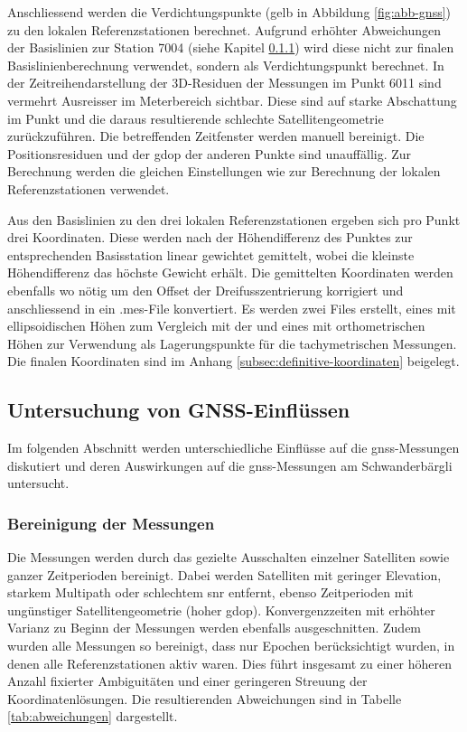 Anschliessend werden die Verdichtungspunkte (gelb in Abbildung \ref{fig:abb-gnss}) zu den lokalen Referenzstationen 
berechnet. Aufgrund erhöhter Abweichungen der Basislinien zur Station 7004 (siehe Kapitel \ref{sec:bereinigung_gnss}) wird 
diese nicht zur finalen Basislinienberechnung verwendet, sondern als Verdichtungspunkt berechnet. 
In der Zeitreihendarstellung der 3D-Residuen der Messungen im Punkt 6011 
sind vermehrt Ausreisser im Meterbereich sichtbar. Diese sind auf starke Abschattung im Punkt 
und die daraus resultierende schlechte Satellitengeometrie zurückzuführen. Die betreffenden Zeitfenster 
werden manuell bereinigt. Die Positionsresiduen und der \gls{gdop} der 
anderen Punkte sind unauffällig. Zur Berechnung werden die gleichen Einstellungen wie zur Berechnung der lokalen Referenzstationen 
verwendet.

Aus den Basislinien zu den drei lokalen Referenzstationen ergeben sich pro Punkt drei Koordinaten. Diese werden nach der Höhendifferenz 
des Punktes zur entsprechenden Basisstation linear gewichtet gemittelt, wobei die kleinste Höhendifferenz das höchste 
Gewicht erhält. Die gemittelten Koordinaten werden ebenfalls wo nötig um den 
Offset der Dreifusszentrierung korrigiert und anschliessend in ein .mes-File konvertiert. Es werden zwei Files erstellt, 
eines mit ellipsoidischen Höhen zum Vergleich mit der  und eines mit 
orthometrischen Höhen zur Verwendung als Lagerungspunkte für die tachymetrischen Messungen. Die finalen Koordinaten 
sind im Anhang \ref{subsec:definitive-koordinaten} beigelegt.

\subsection{Untersuchung von GNSS-Einflüssen}
Im folgenden Abschnitt werden unterschiedliche Einflüsse auf die \acrshort{gnss}-Messungen diskutiert und deren Auswirkungen 
auf die \acrshort{gnss}-Messungen am Schwanderbärgli untersucht.

\subsubsection{Bereinigung der Messungen}
\label{sec:bereinigung_gnss}
Die Messungen werden durch das gezielte Ausschalten einzelner Satelliten sowie ganzer Zeitperioden bereinigt.
Dabei werden Satelliten mit geringer Elevation, starkem Multipath oder schlechtem \gls{snr} entfernt, 
ebenso Zeitperioden mit ungünstiger Satellitengeometrie (hoher \gls{gdop}).
Konvergenzzeiten mit erhöhter Varianz zu Beginn der Messungen werden ebenfalls ausgeschnitten. 
Zudem wurden alle Messungen so bereinigt, dass nur Epochen berücksichtigt wurden, in denen alle Referenzstationen aktiv waren. 
Dies führt insgesamt zu einer höheren Anzahl fixierter Ambiguitäten und einer geringeren Streuung der Koordinatenlösungen. 
Die resultierenden Abweichungen sind in Tabelle \ref{tab:abweichungen} dargestellt. 

